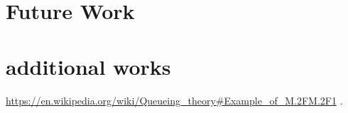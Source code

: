 \documentclass{mcmthesis}
\begin{document}
\section{Future Work}

\section{additional works}


\begin{thebibliography}{99}

 \url{https://en.wikipedia.org/wiki/Queueing_theory#Example_of_M.2FM.2F1}
 .
\end{thebibliography}



\begin{appendices}

\end{appendices}
\end{document}
